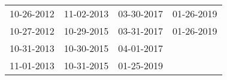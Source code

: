 \begin{supertabular}{llll}
 10-26-2012 &  11-02-2013 &  03-30-2017 &  01-26-2019 \\
 10-27-2012 &  10-29-2015 &  03-31-2017 &  01-26-2019 \\
 10-31-2013 &  10-30-2015 &  04-01-2017 &             \\
 11-01-2013 &  10-31-2015 &  01-25-2019 &             \\
\end{supertabular}
